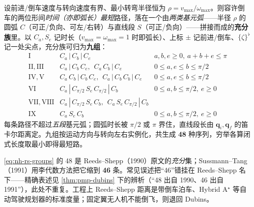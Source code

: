 \begin{theorem}\label{thm:nh-rs}
设前进/倒车速度与转向速度有界、最小转弯半径恒为 $\rho=v_{\max}/\omega_{\max}$。则容许倒车的两位形间\emph{时间（亦即弧长）最短}路径，落在一个由\emph{两类基元弧}——半径 $\rho$ 的圆弧 $C$（可正/负向、可左/右转）与直线段 $S$（可正/负向）——拼接而成的\textbf{充分族}里。以 $C_a,S_e$ 记时长（$v_{\max}=\omega_{\max}=1$ 时即弧长）、上标 $\pm$ 记前进/倒车、$\{\zeta\}^\flat$ 记一处尖点，充分族可归为\textbf{九组}：
\begin{equation}
  \begin{array}{lll}
  \mathrm{I} & C_a\,|\,C_b\,|\,C_e & a,b,e\ge0,\ a+b+e\le\pi\\
  \mathrm{II},\mathrm{III} & C_a\,|\,C_b\,C_e,\ \ C_a\,C_b\,|\,C_e & 0\le a,e\le b\le\pi/2\\
  \mathrm{IV},\mathrm{V} & C_a\,C_b\,|\,C_b\,C_e,\ \ C_a\,|\,C_b\,C_b\,|\,C_e & 0\le a,e\le b\le\pi/2\\
  \mathrm{VI} & C_a\,|\,C_{\pi/2}\,S_e\,C_{\pi/2}\,|\,C_b & 0\le a,b\le\pi/2,\ e\ge0\\
  \mathrm{VII},\mathrm{VIII} & C_a\,|\,C_{\pi/2}\,S_e\,C_b,\ \ C_a\,S_e\,C_{\pi/2}\,|\,C_b & \\
  \mathrm{IX} & C_a\,S_e\,C_b & 0\le a,b\le\pi/2,\ e\ge0
  \end{array}
  \label{eq:nh-rs-groups}
\end{equation}
每条路径不超过\emph{五段}基元弧；圆弧时长被 $\pi/2$ 或 $\pi$ 界住，直线段长由 $\mathbf{q}_i,\mathbf{q}_f$ 的笛卡尔距离定。九组按运动方向与转向左右实例化，共生成 \textbf{48} 种序列，穷举各算闭式长度取最小即得最短路。
\end{theorem}

\begin{remark}[48 与 46：路径数的精确归属]\label{rem:nh-rs-count}
\cref{eq:nh-rs-groups} 的 48 是 Reeds--Shepp（1990）原文的\emph{充分}集；Sussmann--Tang（1991）用李代数方法把它缩到 \textbf{46} 条。常见误述把“46”错挂在 Reeds--Shepp 名下——精确表述见 \cref{thm:pmp-dubins} 下的辨析（“48 出自 1990、46 出自 1991”），此处不重复。工程上 Reeds--Shepp 距离是带倒车泊车、Hybrid A$^\star$ 等自动驾驶规划器的标准度量；固定翼无人机不能倒飞，则退回 Dubins。
\end{remark}

